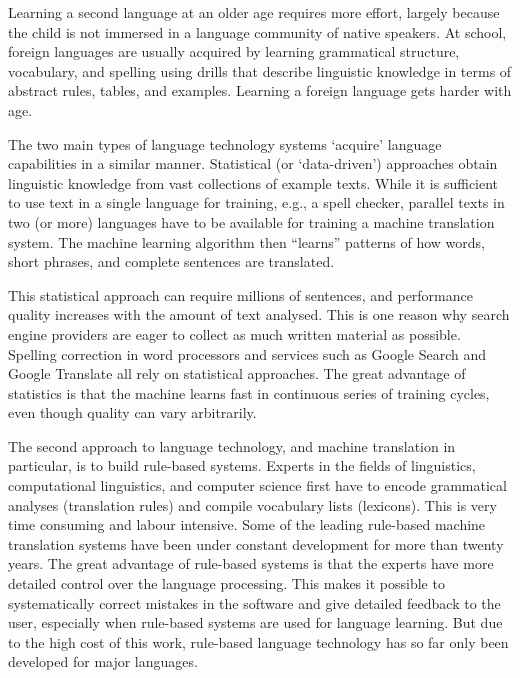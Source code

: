 \begin{multicols}{2}
Learning a second language at an older age requires more effort, largely because the child is not immersed in a language community of native speakers.
At school, foreign languages are usually acquired by learning grammatical structure, vocabulary, and spelling using drills that describe linguistic knowledge in terms of abstract rules, tables, and examples.
Learning a foreign language gets harder with age.


The two main types of language technology systems `acquire' language capabilities in a similar manner.
Statistical (or `data-driven') approaches obtain linguistic knowledge from vast collections of example texts.
While it is sufficient to use text in a single language for training, e.g., a spell checker, parallel texts in two (or more) languages have to be available for training a machine translation system.
The machine learning algorithm then ``learns'' patterns of how words, short phrases, and complete sentences are translated. 

This statistical approach can require millions of sentences, and performance quality increases with the amount of text analysed.
This is one reason why search engine providers are eager to collect as much written material as possible.
Spelling correction in word processors and services such as Google Search and Google Translate all rely on statistical approaches.
The great advantage of statistics is that the machine learns fast in continuous series of training cycles, even though quality can vary arbitrarily.

The second approach to language technology, and machine translation in particular, is to build rule-based systems.
Experts in the fields of linguistics, computational linguistics, and computer science first have to encode grammatical analyses (translation rules) and compile vocabulary lists (lexicons).
This is very time consuming and labour intensive.
Some of the leading rule-based machine translation systems have been under constant development for more than twenty years.
The great advantage of rule-based systems is that the experts have more detailed control over the language processing.
This makes it possible to systematically correct mistakes in the software and give detailed feedback to the user, especially when rule-based systems are used for language learning.
But due to the high cost of this work, rule-based language technology has so far only been developed for major languages. 


\end{multicols}
